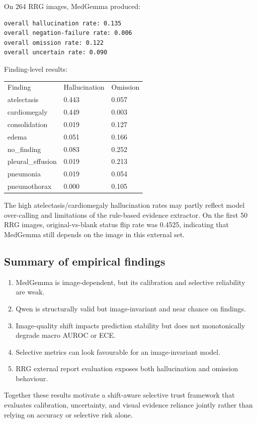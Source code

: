 On 264 RRG images, MedGemma produced:

\begin{verbatim}
overall hallucination rate: 0.135
overall negation-failure rate: 0.006
overall omission rate: 0.122
overall uncertain rate: 0.090
\end{verbatim}

Finding-level results:

\begin{table}[t]
\centering
\small
\begin{tabular}{lll}
\hline
Finding & Hallucination & Omission \\
atelectasis & 0.443 & 0.057 \\
cardiomegaly & 0.449 & 0.003 \\
consolidation & 0.019 & 0.127 \\
edema & 0.051 & 0.166 \\
no\_finding & 0.083 & 0.252 \\
pleural\_effusion & 0.019 & 0.213 \\
pneumonia & 0.019 & 0.054 \\
pneumothorax & 0.000 & 0.105 \\
\hline
\end{tabular}
\end{table}


The high atelectasis/cardiomegaly hallucination rates may partly reflect model over-calling and limitations of the rule-based evidence extractor. On the first 50 RRG images, original-vs-blank status flip rate was 0.4525, indicating that MedGemma still depends on the image in this external set.

\subsection{Summary of empirical findings}

\begin{enumerate}
\item MedGemma is image-dependent, but its calibration and selective reliability are weak.
\item Qwen is structurally valid but image-invariant and near chance on findings.
\item Image-quality shift impacts prediction stability but does not monotonically degrade macro AUROC or ECE.
\item Selective metrics can look favourable for an image-invariant model.
\item RRG external report evaluation exposes both hallucination and omission behaviour.
\end{enumerate}

Together these results motivate a shift-aware selective trust framework that evaluates calibration, uncertainty, and visual evidence reliance jointly rather than relying on accuracy or selective risk alone.
